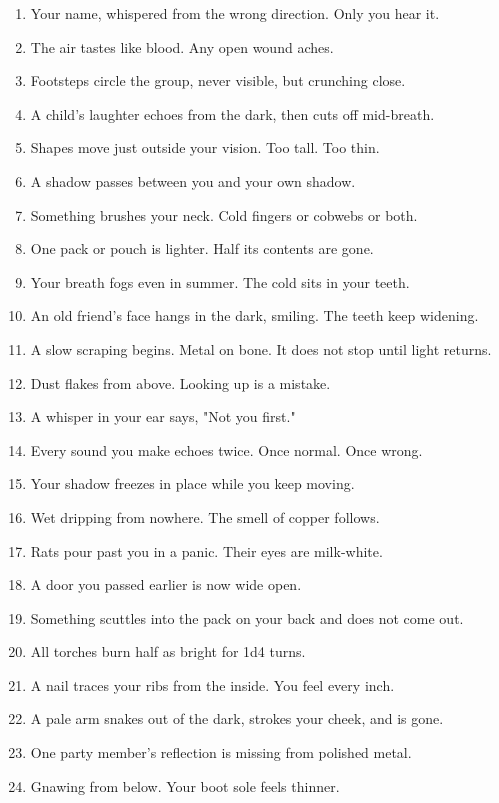 \documentclass[10pt,twoside]{article}
\begin{document}
\begin{multicols}{2}
{\footnotesize
\begin{enumerate}
\item Your name, whispered from the wrong direction. Only you hear it.
\item The air tastes like blood. Any open wound aches.
\item Footsteps circle the group, never visible, but crunching close.
\item A child's laughter echoes from the dark, then cuts off mid-breath.
\item Shapes move just outside your vision. Too tall. Too thin.
\item A shadow passes between you and your own shadow.
\item Something brushes your neck. Cold fingers or cobwebs or both.
\item One pack or pouch is lighter. Half its contents are gone.
\item Your breath fogs even in summer. The cold sits in your teeth.
\item An old friend's face hangs in the dark, smiling. The teeth keep widening.
\item A slow scraping begins. Metal on bone. It does not stop until light returns.
\item Dust flakes from above. Looking up is a mistake.
\item A whisper in your ear says, "Not you first."
\item Every sound you make echoes twice. Once normal. Once wrong.
\item Your shadow freezes in place while you keep moving.
\item Wet dripping from nowhere. The smell of copper follows.
\item Rats pour past you in a panic. Their eyes are milk-white.
\item A door you passed earlier is now wide open.
\item Something scuttles into the pack on your back and does not come out.
\item All torches burn half as bright for 1d4 turns.
\item A nail traces your ribs from the inside. You feel every inch.
\item A pale arm snakes out of the dark, strokes your cheek, and is gone.
\item One party member's reflection is missing from polished metal.
\item Gnawing from below. Your boot sole feels thinner.

\end{enumerate}}
\end{multicols}
\end{document}
